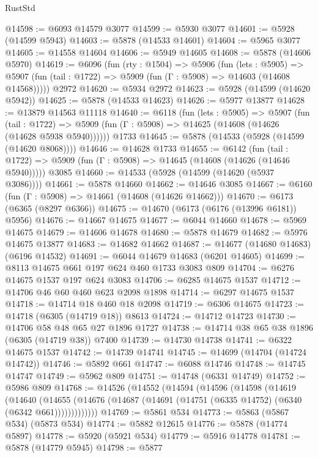 \begin{lexlean}{RustStd}
\begin{coremodule}
@14598 := @6093 @14579 @3077
@14599 := @5930 @3077
@14601 := @5928 (@14599 @5943)
@14603 := @5878 (@14533 @14601)
@14604 := @5965 @3077
@14605 := @14558 @14604
@14606 := @5949 @14605
@14608 := @5878 (@14606 @5970)
@14619 := @6096
    (fun (rty : @1504) =>
    @5906
      (fun (lets : @5905) =>
      @5907 (fun (tail : @1722) => @5909 (fun (Γ : @5908) => @14603 (@14608 @14568)))))
    @2972
@14620 := @5934 @2972
@14623 := @5928 (@14599 (@14620 @5942))
@14625 := @5878 (@14533 @14623)
@14626 := @5977 @13877
@14628 := @13879 @14563 @11118
@14640 := @6118
    (fun (lets : @5905) =>
    @5907
      (fun (tail : @1722) =>
      @5909 (fun (Γ : @5908) => @14625 (@14608 (@14626 (@14628 @5938 @5940))))))
    @1733
@14645 := @5878 (@14533 (@5928 (@14599 (@14620 @8068))))
@14646 := @14628 @1733
@14655 := @6142
    (fun (tail : @1722) => @5909 (fun (Γ : @5908) => @14645 (@14608 (@14626 (@14646 @5940)))))
    @3085
@14660 := @14533 (@5928 (@14599 (@14620 (@5937 @3086))))
@14661 := @5878 @14660
@14662 := @14646 @3085
@14667 := @6160 (fun (Γ : @5908) => @14661 (@14608 (@14626 @14662)))
@14670 := @6173 (@6365 (@8297 @6366))
@14675 := @14670 (@6173 (@6176 (@13996 @6181)) @5956)
@14676 := @14667 @14675
@14677 := @6044 @14660
@14678 := @5969 @14675
@14679 := @14606 @14678
@14680 := @5878 @14679
@14682 := @5976 @14675 @13877
@14683 := @14682 @14662
@14687 := @14677 (@14680 @14683) (@6196 @14532)
@14691 := @6044 @14679 @14683 (@6201 @14605)
@14699 := @8113 @14675 @661 @197 @624 @460 @1733 @3083 @809
@14704 := @6276 @14675 @1537 @197 @624 @3083
@14706 := @6285 @14675 @1537
@14712 := @14706 @46 @60 @460 @623 @2098 @1898
@14714 := @6297 @14675 @1537
@14718 := @14714 @18 @460 @18 @2098
@14719 := @6306 @14675
@14723 := @14718 (@6305 (@14719 @18)) @8613
@14724 := @14712 @14723
@14730 := @14706 @58 @48 @65 @27 @1896 @1727
@14738 := @14714 @38 @65 @38 @1896 (@6305 (@14719 @38)) @7400
@14739 := @14730 @14738
@14741 := @6322 @14675 @1537
@14742 := @14739 @14741
@14745 := @14699 (@14704 (@14724 @14742))
@14746 := @5892 @661
@14747 := @6088 @14746
@14748 := @14745 @14747
@14749 := @5962 @809
@14751 := @14748 (@6331 @14749)
@14752 := @5986 @809
@14768 := @14526
    (@14552
      (@14594
        (@14596
          (@14598
            (@14619
              (@14640
                (@14655
                  (@14676 (@14687 (@14691 (@14751 (@6335 @14752) (@6340 (@6342 @661)))))))))))))
@14769 := @5861 @534
@14773 := @5863 (@5867 @534) (@5873 @534)
@14774 := @5882 @12615
@14776 := @5878 (@14774 @5897)
@14778 := @5920 (@5921 @534)
@14779 := @5916 @14778
@14781 := @5878 (@14779 @5945)
@14798 := @5877

\end{coremodule}
\end{lexlean}
